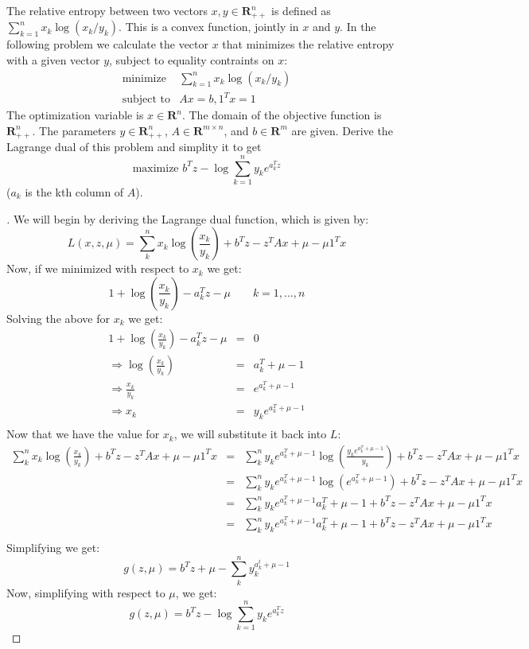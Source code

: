 \begin{prob}[4.4]
  The relative entropy between two vectors $x, y \in \mathbf{R}^{n}_{++}$ is defined as $\sum^{n}_{k=1} x_{k} \log(x_{k}/y_{k})$. This is a convex function, jointly in $x$ and $y$. In the following problem we calculate the vector $x$ that minimizes the relative entropy with a given vector $y$, subject to equality contraints on $x$:
      \begin{eqnarray*}
      \mbox{minimize} & \sum_{k=1}^{n} x_{k} \log(x_{k}/y_{k})\\
      \mbox{subject to} & Ax = b, 1^{T} x = 1
      \end{eqnarray*}
      The optimization variable is $x \in \mathbf{R}^{n}$. The domain of the objective function is $\mathbf{R}^{n}_{++}$. The parameters $y \in \mathbf{R}^{n}_{++}$, $A \in \mathbf{R}^{m \times n}$, and $b \in \mathbf{R}^{m}$ are given. Derive the Lagrange dual of this problem and simplity it to get
      \[
      \mbox{maximize } b^{T} z - \log \sum_{k=1}^{n} y_{k} e^{a^{T}_{k} z}
      \]
      ($a_{k}$ is the kth column of $A$).
\end{prob}
\begin{proof}[\sol]
  We will begin by deriving the Lagrange dual function, which is given by:
  \[
  L(x,z,\mu) = \sum_{k}^{n}x_{k}\log(\frac{x_{k}}{y_{k}}) + b^{T}z - z^{T} A x + \mu - \mu 1^{T} x
  \]
  Now, if we minimized with respect to $x_{k}$ we get:
  \[
  1 + \log(\frac{x_{k}}{y_{k}}) - a^{T}_{k} z - \mu \qquad k = 1, \ldots,n
  \]
  Solving the above for $x_{k}$ we get:
  \begin{eqnarray*}
    1 + \log(\frac{x_{k}}{y_{k}}) - a^{T}_{k} z - \mu &=& 0\\
    \Rightarrow \log(\frac{x_{k}}{y_{k}}) &=& a^{T}_{k} + \mu - 1\\
    \Rightarrow \frac{x_{k}}{y_{k}} &=& e^{a^{T}_{k} + \mu - 1}\\
    \Rightarrow x_{k} &=& y_{k} e^{a^{T}_{k} + \mu - 1}\\
  \end{eqnarray*}
  Now that we have the value for $x_{k}$, we will substitute it back into $L$:
  \begin{eqnarray*}
    \sum_{k}^{n}x_{k}\log(\frac{x_{k}}{y_{k}}) + b^{T}z - z^{T} A x + \mu - \mu 1^{T} x &=& \sum_{k}^{n} y_{k} e^{a^{T}_{k} + \mu - 1}\log(\frac{ y_{k} e^{a^{T}_{k} + \mu - 1}}{y_{k}}) + b^{T}z - z^{T} A x + \mu - \mu 1^{T} x\\ 
    &=& \sum_{k}^{n} y_{k} e^{a^{T}_{k} + \mu - 1}\log(e^{a^{T}_{k} + \mu - 1}) + b^{T}z - z^{T} A x + \mu - \mu 1^{T} x\\
    &=& \sum_{k}^{n} y_{k} e^{a^{T}_{k} + \mu - 1} a^{T}_{k} + \mu - 1 + b^{T}z - z^{T} A x + \mu - \mu 1^{T} x\\
    &=& \sum_{k}^{n} y_{k} e^{a^{T}_{k} + \mu - 1} a^{T}_{k} + \mu - 1 + b^{T}z - z^{T} A x + \mu - \mu 1^{T} x\\ 
  \end{eqnarray*}
  Simplifying we get:
  \[
  g(z,\mu) = b^{T}z + \mu - \sum_{k}^{n}y_{k}^{a^{t}_{k} + \mu - 1}
  \] 
  Now, simplifying with respect to $\mu$, we get:
  \[
  g(z,\mu) = b^{T} z - \log \sum_{k=1}^{n} y_{k} e^{a^{T}_{k} z}
  \]
\end{proof}

